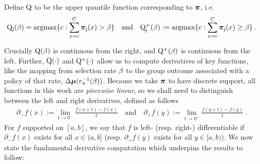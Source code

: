 	\begin{defn} Define $\mathrm{Q}$ to be the upper quantile function corresponding to $\boldsymbol{\pi}$, i.e. \begin{align}
		\RCDFj(\accrate) = \argmax\{c:\sum_{x=c}^C\distj(x) > \accrate\}
		\quad\text{and}\quad \RCDFplj(\accrate):= \argmax\{c:\sum_{x=c}^C\distj(x) \ge \accrate\}\:.
		\end{align}
	\end{defn}
	Crucially $\mathrm{Q}(\beta)$ is continuous from the right, and $\mathrm{Q}^+(\beta)$ is continuous from the left.
	Further, $\mathrm{Q}(\cdot)$ and $\mathrm{Q}^+(\cdot)$ allow us to compute derivatives of key functions, like the mapping from selection rate $\beta$ to the group outcome associated with a policy of that rate, $\Delta\boldsymbol{\mu} (r_{\pi}^{-1}(\beta))$. Because we take $\boldsymbol{\pi}$ to have discrete support, all functions in this work are \emph{piecewise linear}, so we shall need to distinguish between the left and right derivatives, defined as follows
	\begin{eqnarray}
	\partial_- f(x):= \lim_{t \to 0^-}\frac{f(x + t) - f(x)}{t} \quad \text{and} \quad \partial_+ f(y):= \lim_{t \to 0^+}\frac{f(y + t) - f(y)}{t} \:.
	\end{eqnarray}
	For $f$ supported on $[a,b]$, we say that $f$ is left- (resp. right-) differentiable if $\partial_-f(x)$ exists for all $x \in (a,b]$ (resp. $\partial_+ f(y)$ exists for all $y \in [a,b)$). We now state the fundamental derivative computation which underpins the results to follow: 

